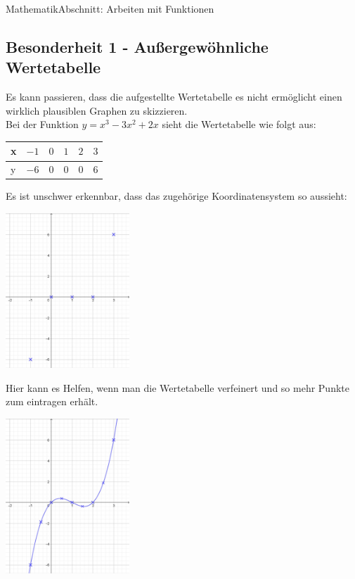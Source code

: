 \documentclass[11pt,twocolumn,oneside,openany,headings=optiontotoc,11pt,numbers=noenddot]{article}
\begin{document}
\begin{worksheet}{}{Mathematik}{Abschnitt: Arbeiten mit Funktionen}
		\subsection{Besonderheit 1 - Außergewöhnliche Wertetabelle}
		Es kann passieren, dass die aufgestellte Wertetabelle es nicht ermöglicht einen wirklich plausiblen Graphen zu skizzieren.\\
		Bei der Funktion \(y = x^3-3x^2 + 2x\) sieht die Wertetabelle wie folgt aus:
		\begin{tabularx}{0.5\textwidth}{|l|X|X|X|X|X|}
			x & \(-1\) & \(0\) & \(1\) & \(2\) & \(3\)\\
			\hline
			y & \(-6\) & \(0\) & \(0\) & \(0\) & \(6\)
		\end{tabularx}
		Es ist unschwer erkennbar, dass das zugehörige Koordinatensystem so aussieht:\\
		\par\bigskip\noindent
		\includegraphics[width=0.35\textwidth]{../99_Bilder/b1Koord.jpg}\\
		\par\bigskip\noindent
		Hier kann es Helfen, wenn man die Wertetabelle verfeinert und so mehr Punkte zum eintragen erhält.\\
		\par\bigskip\noindent
		\includegraphics[width=0.35\textwidth]{../99_Bilder/b1Koord1.jpg}\\

\end{worksheet}
\end{document}
